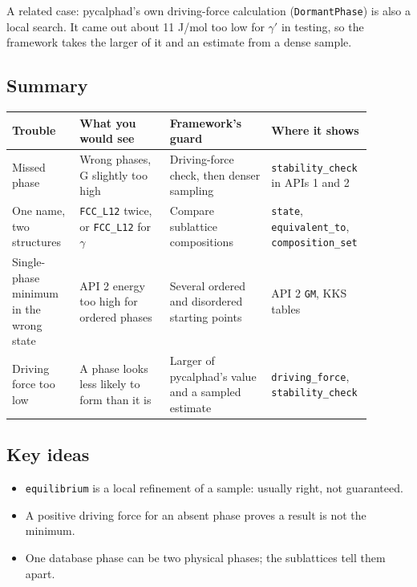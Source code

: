 \documentclass[12pt,a4paper]{article}
\begin{document}
A related case: pycalphad's own driving-force calculation (\texttt{DormantPhase}) is also a local search. It came out about 11 J/mol too low for \(\gamma '\) in testing, so the framework takes the larger of it and an estimate from a dense sample.


\subsection*{Summary}
\begingroup\small
\begin{longtable}{>{\raggedright\arraybackslash}p{0.183\linewidth}>{\raggedright\arraybackslash}p{0.241\linewidth}>{\raggedright\arraybackslash}p{0.272\linewidth}>{\raggedright\arraybackslash}p{0.198\linewidth}}
\toprule
\textbf{Trouble} & \textbf{What you would see} & \textbf{Framework's guard} & \textbf{Where it shows} \\
\midrule
\endhead
Missed phase & Wrong phases, G slightly too high & Driving-force check, then denser sampling & \texttt{stability\_\allowbreak{}check} in APIs 1 and 2 \\
One name, two structures & \texttt{FCC\_\allowbreak{}L12} twice, or \texttt{FCC\_\allowbreak{}L12} for \(\gamma\) & Compare sublattice compositions & \texttt{state}, \texttt{equivalent\_\allowbreak{}to}, \texttt{composition\_\allowbreak{}set} \\
Single-phase minimum in the wrong state & API 2 energy too high for ordered phases & Several ordered and disordered starting points & API 2 \texttt{GM}, KKS tables \\
Driving force too low & A phase looks less likely to form than it is & Larger of pycalphad's value and a sampled estimate & \texttt{driving\_\allowbreak{}force}, \texttt{stability\_\allowbreak{}check} \\
\bottomrule
\end{longtable}
\endgroup

\subsection*{Key ideas}
\begin{itemize}
\item \texttt{equilibrium} is a local refinement of a sample: usually right, not guaranteed.
\item A positive driving force for an absent phase proves a result is not the minimum.
\item One database phase can be two physical phases; the sublattices tell them apart.
\end{itemize}
\end{document}
